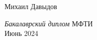 \documentclass[
11pt, %
english, %
singlespacing, %
headsepline, %
]{MastersDoctoralThesis} %
\theoremstyle{plain}
\theoremstyle{definition}
\theoremstyle{remark}
\newcommand\alcentropagina[1]{\AddToShipoutPicture{%
		\AtPageCenter{\makebox(50,0){\texttt{[image: \#1]}}}}}
\begin{document}
\begin{titlepage}
	\begin{center}
		\alcentropagina{Figures/logos/logounict_v2.pdf}
		\vspace{21cm}
		\makeatletter
		\large\textrm{Михаил Давыдов}
		\makeatother
		\vspace{8.85cm}
		\begin{center}
			\makeatletter
			\singlespacing\Huge\textsc{\ttitle}
			\makeatother
		\end{center}%
		\vspace{0.4cm}
		\makeatletter
		\large\textit{Бакалаврский диплом}
		\makeatother
		\vfill
		\large МФТИ\\
		\vspace{1cm}
		\makeatletter
		\large\textrm{Июнь 2024} %
		\makeatother
	\end{center}
\end{titlepage}

\ClearShipoutPicture



\restoregeometry

\pagestyle{plain} %






\end{document}
